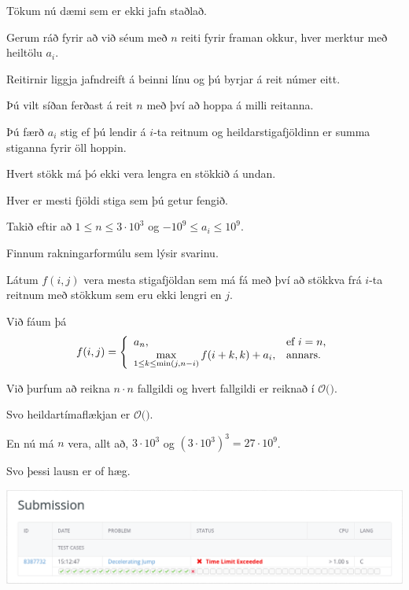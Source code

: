 {
    {
        \item<1-> Tökum nú dæmi sem er ekki jafn staðlað.
            \item<2-> Gerum ráð fyrir að við séum með $n$ reiti fyrir framan okkur, hver merktur með heiltölu $a_i$.
            \item<3-> Reitirnir liggja jafndreift á beinni línu og þú byrjar á reit númer eitt.
            \item<4-> Þú vilt síðan ferðast á reit $n$ með því að hoppa á milli reitanna.
            \item<5-> Þú færð $a_i$ stig ef þú lendir á $i$-ta reitnum og heildarstigafjöldinn er summa stiganna fyrir öll hoppin.
            \item<6-> Hvert stökk má þó ekki vera lengra en stökkið á undan.
            \item<7-> Hver er mesti fjöldi stiga sem þú getur fengið.
            \item<8-> Takið eftir að $1 \leq n \leq 3 \cdot 10^3$ og $-10^9 \leq a_i \leq 10^9$.
    }
}

{
    {
        \item<1-> Finnum rakningarformúlu sem lýsir svarinu.
            \item<2-> Látum $f(i, j)$ vera mesta stigafjöldan sem má fá með því að stökkva frá $i$-ta reitnum með stökkum sem eru ekki lengri en $j$.
            \item<3-> Við fáum þá
            \[
            f(i, j) = 
                \left \{
                \env{array}
        {
            {l l}
            a_n, & \text{ef $i = n$},\\
                \max\limits_{1 \leq k \leq \min(j, n - i)} f(i + k, k) + a_i, & \text{annars}.
        }
        \right .
            \]
    }
}

{
}

{
    {
        \item<1-> Við þurfum að reikna $n \cdot n$ fallgildi og hvert fallgildi er reiknað í $\mathcal{O}($$)$.
            \item<3-> Svo heildartímaflækjan er $\mathcal{O}($$)$.
            \item<5-> En nú má $n$ vera, allt að, $3 \cdot 10^3$ og $(3 \cdot 10^3)^3 = 27 \cdot 10^9$.
            \item<6-> Svo þessi lausn er of hæg.
            \item<7->[] \includegraphics[scale = 0.25]{fig/tle1.png}
    }
}

